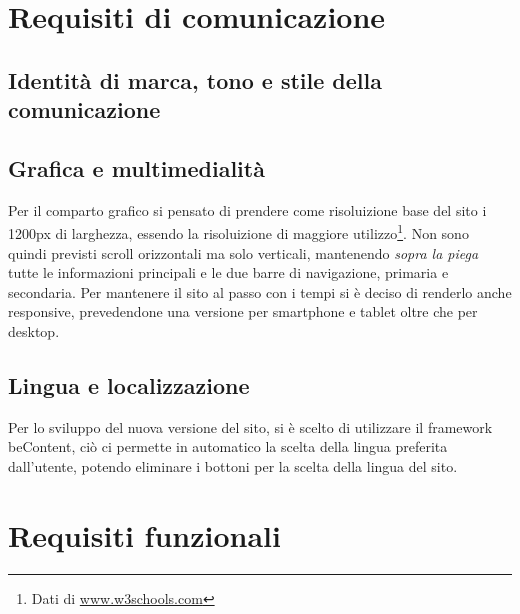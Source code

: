 \documentclass[a4paper,12pt,hidelinks]{report}
\begin{document}
\section{Requisiti di comunicazione}
\subsection{Identità di marca, tono e stile della comunicazione}

\subsection{Grafica e multimedialità}
Per il comparto grafico si pensato di prendere come risoluizione base del sito i 1200px di larghezza, essendo la risoluizione di maggiore utilizzo\footnote{Dati di \url{www.w3schools.com}}.
Non sono quindi previsti scroll orizzontali ma solo verticali, mantenendo \textit{sopra la piega} tutte le informazioni principali e le due barre di navigazione, primaria e secondaria. Per mantenere
il sito al passo con i tempi si è deciso di renderlo anche responsive, prevedendone una versione per smartphone e tablet oltre che per desktop.
\subsection{Lingua e localizzazione}
Per lo sviluppo del nuova versione del sito, si è scelto di utilizzare il framework beContent, ciò ci permette in automatico la scelta della lingua preferita dall'utente, potendo eliminare i bottoni per la 
scelta della lingua del sito. 

\section{Requisiti funzionali}
\end{document}
